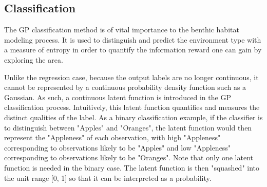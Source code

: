 				
		\subsection{Classification}
		\label{Background:GaussianProcesses:Classification}
		
			The GP classification method is of vital importance to the benthic habitat modeling process. It is used to distinguish and predict the environment type with a measure of entropy in order to quantify the information reward one can gain by exploring the area.
			
			Unlike the regression case, because the output labels are no longer continuous, it cannot be represented by a continuous probability density function such as a Gaussian. As such, a continuous latent function is introduced in the GP classification process. Intuitively, this latent function quantifies and measures the distinct qualities of the label. As a binary classification example, if the classifier is to distinguish between "Apples" and "Oranges", the latent function would then represent the "Appleness" of each observation, with high "Appleness" corresponding to observations likely to be "Apples" and low "Appleness" corresponding to observations likely to be "Oranges". Note that only one latent function is needed in the binary case. The latent function is then "squashed" into the unit range [0, 1] so that it can be interpreted as a probability.
			
